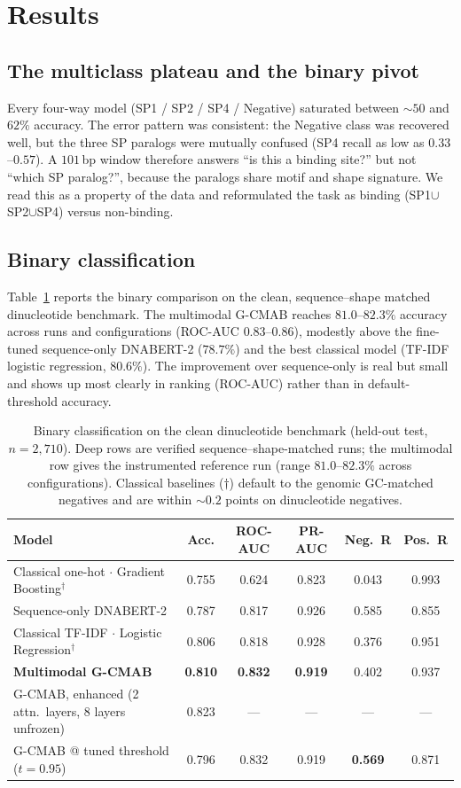 \documentclass[11pt]{article}
\begin{document}
\section{Results}

\subsection{The multiclass plateau and the binary pivot}
Every four-way model (SP1 / SP2 / SP4 / Negative) saturated between $\sim\!50$ and
$62\%$ accuracy. The error pattern was consistent: the Negative class was recovered
well, but the three SP paralogs were mutually confused (SP4 recall as low as
$0.33$--$0.57$). A $101$\,bp window therefore answers ``is this a binding site?'' but
not ``which SP paralog?'', because the paralogs share motif and shape signature. We
read this as a property of the data and reformulated the task as binding
(SP1$\cup$SP2$\cup$SP4) versus non-binding.

\subsection{Binary classification}
Table~\ref{tab:binary} reports the binary comparison on the clean, sequence--shape
matched dinucleotide benchmark. The multimodal G-CMAB reaches $81.0$--$82.3\%$
accuracy across runs and configurations (ROC-AUC $0.83$--$0.86$), modestly above the
fine-tuned sequence-only DNABERT-2 ($78.7\%$) and the best classical model
(TF-IDF logistic regression, $80.6\%$). The improvement over sequence-only is real
but small and shows up most clearly in ranking (ROC-AUC) rather than in
default-threshold accuracy.

\begin{table}[ht]
\centering
\caption{Binary classification on the clean dinucleotide benchmark (held-out test,
$n=2{,}710$). Deep rows are verified sequence--shape-matched runs; the multimodal
row gives the instrumented reference run (range $81.0$--$82.3\%$ across
configurations). Classical baselines ($\dagger$) default to the genomic GC-matched
negatives and are within $\sim\!0.2$ points on dinucleotide negatives.}
\label{tab:binary}
\begin{tabular}{lccccc}
\toprule
Model & Acc. & ROC-AUC & PR-AUC & Neg.\ R & Pos.\ R \\
\midrule
Classical one-hot $\cdot$ Gradient Boosting$^{\dagger}$ & 0.755 & 0.624 & 0.823 & 0.043 & 0.993 \\
Sequence-only DNABERT-2 & 0.787 & 0.817 & 0.926 & 0.585 & 0.855 \\
Classical TF-IDF $\cdot$ Logistic Regression$^{\dagger}$ & 0.806 & 0.818 & 0.928 & 0.376 & 0.951 \\
\textbf{Multimodal G-CMAB} & \textbf{0.810} & \textbf{0.832} & \textbf{0.919} & 0.402 & 0.937 \\
\quad G-CMAB, enhanced (2 attn.\ layers, 8 layers unfrozen) & 0.823 & --- & --- & --- & --- \\
\quad G-CMAB @ tuned threshold ($t=0.95$) & 0.796 & 0.832 & 0.919 & \textbf{0.569} & 0.871 \\
\bottomrule
\end{tabular}
\end{table}
\end{document}
